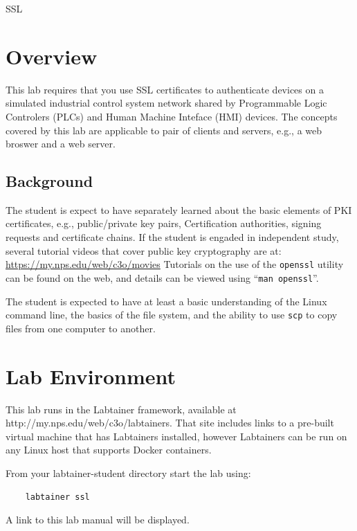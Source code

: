 


\begin{center}
{\LARGE SSL}
\vspace{0.1in}\\
\end{center}

\copyrightnotice

\section{Overview}
This lab requires that you use SSL certificates to authenticate devices
on a simulated industrial control system network shared by 
Programmable Logic Controlers (PLCs) and Human Machine Inteface (HMI) devices.
The concepts covered by this lab are applicable to pair of clients and servers,
e.g., a web broswer and a web server.

\subsection {Background}
The student is expect to have separately learned about the basic elements of PKI 
certificates, e.g., public/private key pairs, Certification authorities, 
signing requests and certificate chains.  If the student is engaded in independent
study, several tutorial videos that cover public key cryptography are at:
\url{https://my.nps.edu/web/c3o/movies}
Tutorials on the use of the {\tt openssl} utility can be found on the web, and details
can be viewed using ``{\tt man openssl}''.

The student is expected to have at least a basic understanding of the Linux command line,
the basics of the file system, and the ability to use {\tt scp} to copy files from
one computer to another.

\section{Lab Environment}
This lab runs in the Labtainer framework,
available at http://my.nps.edu/web/c3o/labtainers.
That site includes links to a pre-built virtual machine
that has Labtainers installed, however Labtainers can
be run on any Linux host that supports Docker containers.

From your labtainer-student directory start the lab using:
\begin{verbatim}
    labtainer ssl
\end{verbatim}
\noindent A link to this lab manual will be displayed.  

